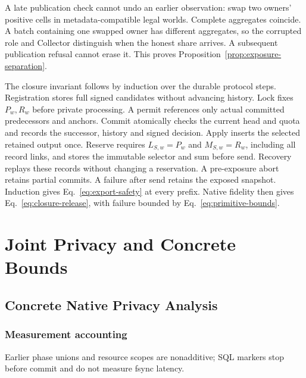 A late publication check cannot undo an earlier observation: swap two owners' positive cells in metadata-compatible legal worlds.
Complete aggregates coincide. A batch containing one swapped owner has
different aggregates, so the corrupted role and Collector distinguish when
the honest share arrives. A subsequent publication refusal cannot erase it.
This proves Proposition~\ref{prop:exposure-separation}.

The closure invariant follows by induction over the durable protocol steps. Registration stores full signed candidates without advancing history.
Lock fixes \(P_w,R_w\) before private processing. A permit references only
actual committed predecessors and anchors. Commit atomically checks the
current head and quota and records the successor, history and signed decision.
Apply inserts the selected retained output once. Reserve requires
\(L_{S,w}=P_w\) and \(M_{S,w}=R_w\), including all record links, and
stores the immutable selector and sum before send. Recovery replays these
records without changing a reservation. A pre-exposure abort retains
partial commits. A failure after send retains the exposed snapshot.
Induction gives Eq.~\eqref{eq:export-safety} at every prefix.
Native fidelity then gives Eq.~\eqref{eq:closure-release}, with failure
bounded by Eq.~\eqref{eq:primitive-bounds}.

\section{Joint Privacy and Concrete Bounds}
\label{app:native-theory}
\subsection{Concrete Native Privacy Analysis}


\subsubsection{Measurement accounting}
\label{app:phase-accounting}
Earlier phase unions and resource scopes are nonadditive; SQL markers stop
before commit and do not measure fsync latency.
